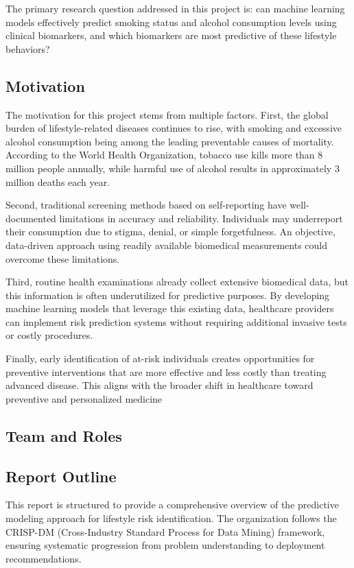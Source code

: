\documentclass[11pt,a4paper]{article}
\begin{document}
\noindent The primary research question addressed in this project is: can machine learning models effectively predict smoking status and alcohol consumption levels using clinical biomarkers, and which biomarkers are most predictive of these lifestyle behaviors?

\subsection{Motivation}

The motivation for this project stems from multiple factors. First, the global burden of lifestyle-related diseases continues to rise, with smoking and excessive alcohol consumption being among the leading preventable causes of mortality. According to the World Health Organization, tobacco use kills more than 8 million people annually, while harmful use of alcohol results in approximately 3 million deaths each year.

\noindent Second, traditional screening methods based on self-reporting have well-documented limitations in accuracy and reliability. Individuals may underreport their consumption due to stigma, denial, or simple forgetfulness. An objective, data-driven approach using readily available biomedical measurements could overcome these limitations.

\noindent Third, routine health examinations already collect extensive biomedical data, but this information is often underutilized for predictive purposes. By developing machine learning models that leverage this existing data, healthcare providers can implement risk prediction systems without requiring additional invasive tests or costly procedures.

\noindent Finally, early identification of at-risk individuals creates opportunities for preventive interventions that are more effective and less costly than treating advanced disease. This aligns with the broader shift in healthcare toward preventive and personalized medicine

\subsection{Team and Roles}

\subsection{Report Outline}
This report is structured to provide a comprehensive overview of the predictive modeling approach for lifestyle risk identification. The organization follows the CRISP-DM (Cross-Industry Standard Process for Data Mining) framework, ensuring systematic progression from problem understanding to deployment recommendations.
\end{document}
